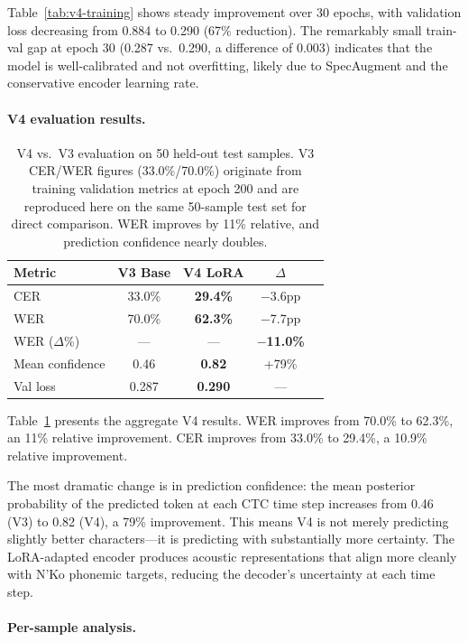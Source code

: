 \documentclass[11pt]{article}
\begin{document}
Table~\ref{tab:v4-training} shows steady improvement over 30 epochs, with validation loss decreasing from 0.884 to 0.290 (67\% reduction).
The remarkably small train-val gap at epoch 30 (0.287 vs.\ 0.290, a difference of 0.003) indicates that the model is well-calibrated and not overfitting, likely due to SpecAugment and the conservative encoder learning rate.

\paragraph{V4 evaluation results.}

\begin{table}[t]
\centering
\small
\begin{tabular}{lcccc}
\toprule
\textbf{Metric} & \textbf{V3 Base} & \textbf{V4 LoRA} & \textbf{$\Delta$} \\
\midrule
CER & 33.0\% & \textbf{29.4\%} & $-$3.6pp \\
WER & 70.0\% & \textbf{62.3\%} & $-$7.7pp \\
WER ($\Delta$\%) & --- & --- & \textbf{$-$11.0\%} \\
Mean confidence & 0.46 & \textbf{0.82} & +79\% \\
Val loss & 0.287 & \textbf{0.290} & --- \\
\bottomrule
\end{tabular}
\caption{V4 vs.\ V3 evaluation on 50 held-out test samples. V3 CER/WER figures (33.0\%/70.0\%) originate from training validation metrics at epoch 200 and are reproduced here on the same 50-sample test set for direct comparison. WER improves by 11\% relative, and prediction confidence nearly doubles.}
\label{tab:v4-results}
\end{table}

Table~\ref{tab:v4-results} presents the aggregate V4 results.
WER improves from 70.0\% to 62.3\%, an 11\% relative improvement.
CER improves from 33.0\% to 29.4\%, a 10.9\% relative improvement.

The most dramatic change is in prediction confidence: the mean posterior probability of the predicted token at each CTC time step increases from 0.46 (V3) to 0.82 (V4), a 79\% improvement.
This means V4 is not merely predicting slightly better characters---it is predicting with substantially more certainty.
The LoRA-adapted encoder produces acoustic representations that align more cleanly with N'Ko phonemic targets, reducing the decoder's uncertainty at each time step.

\paragraph{Per-sample analysis.}
\end{document}
